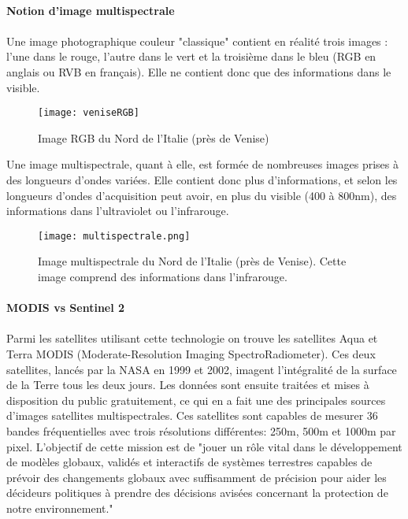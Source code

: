 \paragraph{Notion d'image multispectrale}
\paragraph{}
Une image photographique couleur "classique" contient en réalité trois images : l'une dans le rouge, l'autre dans le vert et la troisième dans le bleu (RGB en anglais ou RVB en français). Elle ne contient donc que des informations dans le visible. 
\begin{figure}[H]
  \centering
    \texttt{[image: veniseRGB]}
  \caption{Image RGB du Nord de l'Italie (près de Venise)}
  \label{fig:veniseRGB}
\end{figure}

Une image multispectrale, quant à elle, est formée de nombreuses images prises à des longueurs d'ondes variées. Elle contient donc plus d'informations, et selon les longueurs d'ondes d'acquisition peut avoir, en plus du visible (400 à 800nm), des informations dans l'ultraviolet ou l'infrarouge.

\begin{figure}[H]
  \centering
    \texttt{[image: multispectrale.png]}
  \caption{Image multispectrale du Nord de l'Italie (près de Venise). Cette image comprend des informations dans l'infrarouge.}
  \label{fig:veniseMulti}
\end{figure}

\paragraph{MODIS vs Sentinel 2}
\paragraph{}
Parmi les satellites utilisant cette technologie on trouve les satellites Aqua et Terra MODIS (Moderate-Resolution Imaging SpectroRadiometer). Ces deux satellites, lancés par la NASA en 1999 et 2002, imagent l'intégralité de la surface de la Terre tous les deux jours. Les données sont ensuite traitées et mises à disposition du public gratuitement, ce qui en a fait une des principales sources d'images satellites multispectrales. Ces satellites sont capables de mesurer 36 bandes fréquentielles avec trois résolutions différentes: 250m, 500m et 1000m par pixel. L'objectif de cette mission est de "jouer un rôle vital dans le développement de modèles globaux, validés et interactifs de systèmes terrestres capables de prévoir des changements globaux avec suffisamment de précision pour aider les décideurs politiques à prendre des décisions avisées concernant la protection de notre environnement."\cite{nasa}

